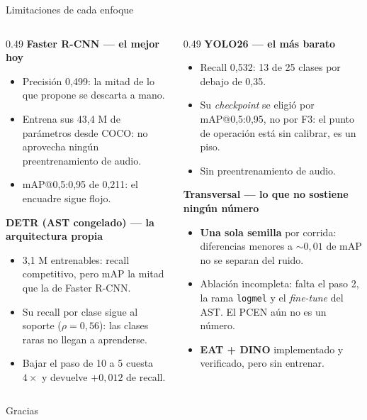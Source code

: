 \documentclass[aspectratio=169,10pt]{beamer}
\begin{document}
\begin{frame}{Limitaciones de cada enfoque}
  \scriptsize
  \begin{columns}[T]
    \begin{column}{0.49\textwidth}
      \textbf{\color{cFRCNN}Faster R-CNN --- el mejor hoy}
      \begin{itemize}
        \item Precisión 0,499: la mitad de lo que propone se descarta a mano.
        \item Entrena sus 43,4 M de parámetros desde COCO: no aprovecha ningún
              preentrenamiento de audio.
        \item mAP@0,5:0,95 de 0,211: el encuadre sigue flojo.
      \end{itemize}
      \medskip
      \textbf{\color{cDETR}DETR (AST congelado) --- la arquitectura propia}
      \begin{itemize}
        \item 3,1 M entrenables: recall competitivo, pero mAP la mitad que la de
              Faster R-CNN.
        \item Su recall por clase sigue al soporte ($\rho = 0{,}56$): las clases
              raras no llegan a aprenderse.
        \item Bajar el paso de 10 a 5 cuesta $4\times$ y devuelve $+0{,}012$ de recall.
      \end{itemize}
    \end{column}
    \begin{column}{0.49\textwidth}
      \textbf{\color{cYOLO}YOLO26 --- el más barato}
      \begin{itemize}
        \item Recall 0,532: 13 de 25 clases por debajo de 0,35.
        \item Su \textit{checkpoint} se eligió por mAP@0,5:0,95, no por F3: el punto
              de operación está sin calibrar, es un piso.
        \item Sin preentrenamiento de audio.
      \end{itemize}
      \medskip
      \textbf{\color{cMuted}Transversal --- lo que no sostiene ningún número}
      \begin{itemize}
        \item \textbf{Una sola semilla} por corrida: diferencias menores a
              $\sim0{,}01$ de mAP no se separan del ruido.
        \item Ablación incompleta: falta el paso 2, la rama \texttt{logmel} y el
              \textit{fine-tune} del AST. El PCEN aún no es un número.
        \item \textbf{EAT + DINO} implementado y verificado, pero sin entrenar.
      \end{itemize}
    \end{column}
  \end{columns}
\end{frame}

\begin{frame}[standout]
  Gracias
\end{frame}
\end{document}
